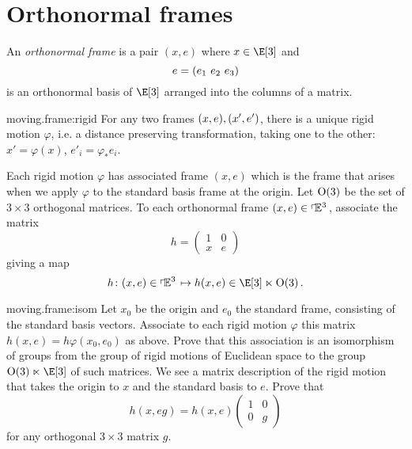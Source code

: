 \section{Orthonormal frames}
An \emph{orthonormal frame} is a pair \((x,e)\) where \(x \in \E[3]\) and 
\[
 e=\left(e_1 \ e_2 \ e_3\right)
\]
is an orthonormal basis of \(\E[3]\) arranged into the columns of a matrix.
\begin{center}

\end{center}
\begin{problem}{moving.frame:rigid}
For any two frames \((x,e), \left(x',e'\right)\), there is a unique rigid motion \(\varphi\), i.e. a distance preserving transformation, taking one to the other: \(x'=\varphi(x)\), \(e'_i=\varphi_* e_i\).
\end{problem}
Each rigid motion \(\varphi\) has associated frame \((x,e)\) which is the frame that arises when we apply \(\varphi\) to the standard basis frame at the origin.
Let \(\textrm{O}\!\left(3\right)\) be the set of \(3 \times 3\) orthogonal matrices.
To each orthonormal frame \((x,e)\in\left\ulcorner\!\mathbb{E}^{3}\right.\), associate the matrix
\[
h=
\begin{pmatrix}
1 & 0 \\
x & e
\end{pmatrix}
\]
giving a map
\[
h \colon (x,e) \in \frameBundleE{3}\mapsto h(x,e) \in \E[3] \ltimes \Orth{3}.
\]
\begin{problem}{moving.frame:isom}
Let \(x_0\) be the origin and \(e_0\) the standard frame, consisting of the standard basis vectors.
Associate to each rigid motion \(\varphi\) this matrix \(h(x,e)=h \varphi(x_0,e_0)\) as above.
Prove that this association is an isomorphism of groups from the group of rigid motions of Euclidean space to the group \(\Orth{3} \ltimes \E[3]\) of such matrices.
We see a matrix description of the rigid motion that takes the origin to \(x\) and the standard basis to \(e\).
Prove that
\[
h(x,eg)=h(x,e)
\begin{pmatrix}
1 & 0 \\
0 & g
\end{pmatrix}
\]
for any orthogonal \(3 \times 3\) matrix \(g\).
\end{problem}

